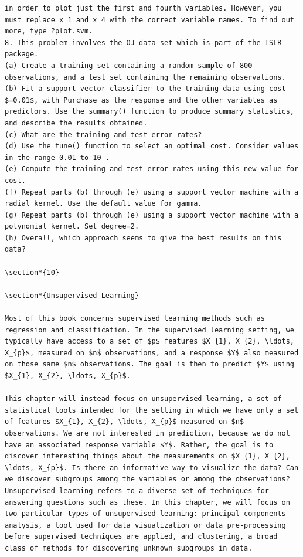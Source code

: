 \documentclass[10pt]{article}
\begin{document}
\begin{verbatim}
in order to plot just the first and fourth variables. However, you must replace x 1 and x 4 with the correct variable names. To find out more, type ?plot.svm.
8. This problem involves the OJ data set which is part of the ISLR package.
(a) Create a training set containing a random sample of 800 observations, and a test set containing the remaining observations.
(b) Fit a support vector classifier to the training data using cost $=0.01$, with Purchase as the response and the other variables as predictors. Use the summary() function to produce summary statistics, and describe the results obtained.
(c) What are the training and test error rates?
(d) Use the tune() function to select an optimal cost. Consider values in the range 0.01 to 10 .
(e) Compute the training and test error rates using this new value for cost.
(f) Repeat parts (b) through (e) using a support vector machine with a radial kernel. Use the default value for gamma.
(g) Repeat parts (b) through (e) using a support vector machine with a polynomial kernel. Set degree=2.
(h) Overall, which approach seems to give the best results on this data?

\section*{10}

\section*{Unsupervised Learning}

Most of this book concerns supervised learning methods such as regression and classification. In the supervised learning setting, we typically have access to a set of $p$ features $X_{1}, X_{2}, \ldots, X_{p}$, measured on $n$ observations, and a response $Y$ also measured on those same $n$ observations. The goal is then to predict $Y$ using $X_{1}, X_{2}, \ldots, X_{p}$.

This chapter will instead focus on unsupervised learning, a set of statistical tools intended for the setting in which we have only a set of features $X_{1}, X_{2}, \ldots, X_{p}$ measured on $n$ observations. We are not interested in prediction, because we do not have an associated response variable $Y$. Rather, the goal is to discover interesting things about the measurements on $X_{1}, X_{2}, \ldots, X_{p}$. Is there an informative way to visualize the data? Can we discover subgroups among the variables or among the observations? Unsupervised learning refers to a diverse set of techniques for answering questions such as these. In this chapter, we will focus on two particular types of unsupervised learning: principal components analysis, a tool used for data visualization or data pre-processing before supervised techniques are applied, and clustering, a broad class of methods for discovering unknown subgroups in data.


\end{verbatim}
\end{document}
